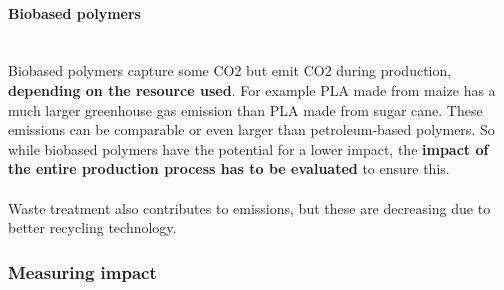 \documentclass[../summary.tex]{subfiles}
\begin{document}
\paragraph{Biobased polymers}
\ \\
Biobased polymers capture some CO2 but emit CO2 during production, \textbf{depending on the resource used}. For example PLA made from maize has a much larger greenhouse gas emission than PLA made from sugar cane. These emissions can be comparable or even larger than petroleum-based polymers. So while biobased polymers have the potential for a lower impact, the \textbf{impact of the entire production process has to be evaluated} to ensure this.\\
\\
Waste treatment also contributes to emissions, but these are decreasing due to better recycling technology.

\subsubsection{Measuring impact}
\end{document}
